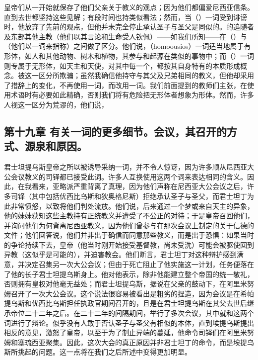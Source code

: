 皇帝们从一开始就保存了他们父亲关于教义的观点；因为他们都偏爱尼西亚信条。直到去世都坚持这些见解；有段时间也持类似看法；然而，当（）一词受到诽谤时，他放弃了先前的观点，但他并未完全停止承认圣子与圣父是同似的。的追随者及东部其他主教（他们以其言论和生命受人钦佩）——如我们所知——在（）与（他们以一词来指称）之间做了区分。他们说，（homoousios）一词适当地属于有形体，如人和其他动物、树木和植物，其参与和起源在类似的事物中；而（）一词则专属于无形体，如天主和天使，对其中每一个，都按其自身特有的本质形成概念。被这一区分所欺骗；虽然我确信他持守与其父及兄弟相同的教义，但他却采用了措辞上的变化，不再使用一词，而改用一词。我们前面提到的教师们主张，在使用术语时有必要如此精确，否则我们将有危险把无形体者想象为形体。然而，许多人视这一区分为荒谬的，他们说，\par


\subsection{第十九章 有关一词的更多细节。会议，其召开的方式、源泉和原因。}

君士坦提乌斯皇帝之所以被诱导采纳一词，并不令人惊讶，因为许多顺从尼西亚大公会议教义的司铎都已接受此词。许多人互换使用这两个词来表达相同的含义。因此，在我看来，亚略派严重背离了真理，因为他们声称在尼西亚大公会议之后，许多司铎（其中包括优西比乌斯和狄奥格尼斯）拒绝承认圣子与圣父，而君士坦丁为此非常愤怒，以致将他们判处流放。他们说，后来通过一个梦或来自天主的异象，他的妹妹获知这些主教持有正统教义并遭受了不公正的对待；于是皇帝召回他们，并询问他们为何背离尼西亚教义，因为他们曾参与在那次会议上制定的关于信德的文件；他们回答说，他们并非出于确信而同意那些教义，而是出于恐惧：如果当时的争论持续下去，皇帝（他当时刚开始接受基督教，尚未受洗）可能会被驱使回到异教（这似乎是可能的），并迫害教会。他们断言，君士坦丁对这种辩护感到满意，并决定召集另一次大公会议；但由于死亡阻止了他实施这一计划，任务便落在了他的长子君士坦提乌斯身上。他对他表示，除非他能建立整个帝国的统一敬礼，否则拥有皇权对他毫无益处；而君士坦提乌斯，据说在父亲的鼓动下，在阿里米努姆召开了一次大公会议。这个说法很容易被看出是粗劣的捏造，因为会议是在希帕提乌斯和优西比乌斯担任执政官期间召开的，且是在君士坦提乌斯在其父去世后继承帝位二十二年之后。在二十二年的间隔期间，举行了多次会议，其中就和这两个词进行了辩论。似乎没有人敢于否认圣子与圣父有相似的本体，直到埃提乌斯提出相反的意见，激怒了皇帝，以至于为了制止异端的蔓延，他命令司铎们在阿里米努姆和塞琉西亚聚集。因此，这次大会的真正原因并非君士坦丁的命令，而是埃提乌斯所挑起的问题。这一点将在我们之后所述中变得更加明显。\par

